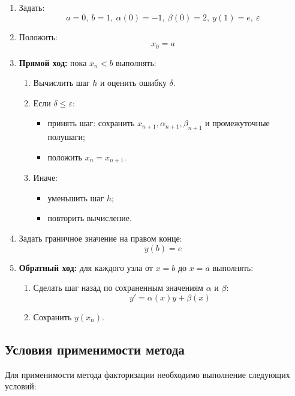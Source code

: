 \documentclass[14pt]{extarticle}
\begin{document}
	\begin{enumerate}
		\item Задать:
		\[
		a = 0,\ b = 1,\ \alpha(0) = -1,\ \beta(0) = 2,\ y(1) = e,\ \varepsilon
		\]
		
		\item Положить:
		\[
		x_0 = a
		\]
		
		\item \textbf{Прямой ход:} пока $x_n < b$ выполнять:
		
		\begin{enumerate}
			\item Вычислить шаг $h$ и оценить ошибку $\delta$.
			\item Если $\delta \le \varepsilon$:
			\begin{itemize}
				\item принять шаг: сохранить $x_{n+1}, \alpha_{n+1}, \beta_{n+1}$ и промежуточные полушаги;
				\item положить $x_n = x_{n+1}$.
			\end{itemize}
			\item Иначе:
			\begin{itemize}
				\item уменьшить шаг $h$;
				\item повторить вычисление.
			\end{itemize}
		\end{enumerate}
		
		\item Задать граничное значение на правом конце:
		\[
		y(b) = e
		\]
		
		\item \textbf{Обратный ход:} для каждого узла от $x = b$ до $x = a$ выполнять:
		
		\begin{enumerate}
			\item Сделать шаг назад по сохраненным значениям $\alpha$ и $\beta$:
			\[
			y' = \alpha(x) y + \beta(x)
			\]
			\item Сохранить $y(x_n)$.
		\end{enumerate}
	\end{enumerate}
	
	\subsection{Условия применимости метода}
	
	Для применимости метода факторизации необходимо выполнение следующих условий:
	
\end{document}
